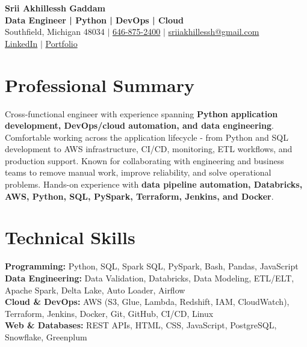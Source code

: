 \documentclass[letterpaper,10pt]{article}
\begin{document}
\fontsize{9.35pt}{10.45pt}\selectfont

\begin{center}
    {\LARGE \textbf{Srii Akhillessh Gaddam}} \\[-1pt]
    \textbf{Data Engineer | Python | DevOps | Cloud} \\[2pt]
    Southfield, Michigan 48034 $|$
    \href{tel:6468752400}{646-875-2400} $|$
    \href{mailto:sriiakhillessh@gmail.com}{sriiakhillessh@gmail.com} \\[1pt]
    \href{https://www.linkedin.com/in/srii-akhiilessh-gaddam-b48668191/}{LinkedIn} $|$
    \href{https://sriiakhillesshg.github.io/portfolio/}{Portfolio}
\end{center}
\vspace{-8pt}

\section{Professional Summary}
\small{Cross-functional engineer with experience spanning \textbf{Python application development, DevOps/cloud automation, and data engineering}. Comfortable working across the application lifecycle - from Python and SQL development to AWS infrastructure, CI/CD, monitoring, ETL workflows, and production support. Known for collaborating with engineering and business teams to remove manual work, improve reliability, and solve operational problems. Hands-on experience with \textbf{data pipeline automation, Databricks, AWS, Python, SQL, PySpark, Terraform, Jenkins, and Docker}.}

\section{Technical Skills}
\small{
\textbf{Programming:} Python, SQL, Spark SQL, PySpark, Bash, Pandas, JavaScript \\
\textbf{Data Engineering:} Data Validation, Databricks, Data Modeling, ETL/ELT, Apache Spark, Delta Lake, Auto Loader, Airflow \\
\textbf{Cloud \& DevOps:} AWS (S3, Glue, Lambda, Redshift, IAM, CloudWatch), Terraform, Jenkins, Docker, Git, GitHub, CI/CD, Linux \\
\textbf{Web \& Databases:} REST APIs, HTML, CSS, JavaScript, PostgreSQL, Snowflake, Greenplum
}

\end{document}
